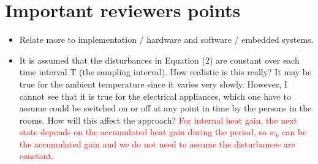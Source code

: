 \documentclass{sig-alternate}
\begin{document}
%


\section{Important reviewers points}

\begin{itemize}
\item Relate more to implementation / hardware and software / embedded systems.
\item It is assumed that the disturbances in Equation (2) are constant over each time
interval T (the sampling interval). How realistic is this really? It may be
true for the ambient temperature since it varies very slowly. However, I cannot
see that it is true for the electrical appliances, which one have to assume
could be switched on or off at any point in time by the persons in the rooms.
How will this affect the approach? \textcolor{red}{For internal heat gain, the next state depends on the accumulated heat gain during the period, so $w_{k}$ can be the accumulated gain and we do not need to assume the disturbances are constant.}

\end{itemize}
\end{document}
